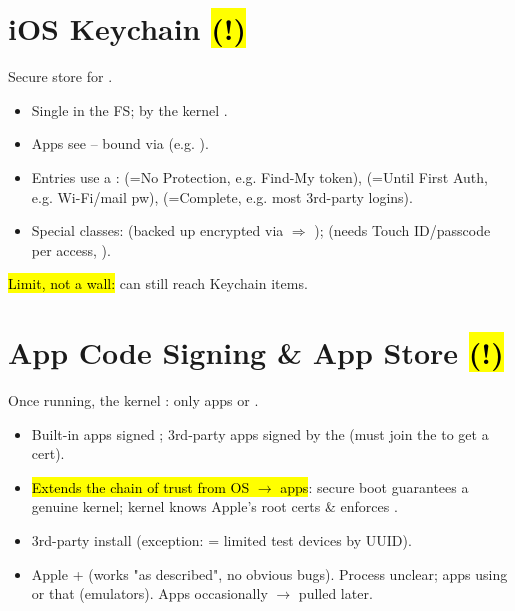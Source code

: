 \section{iOS Keychain \hl{(!)}}
Secure store for .
\begin{itemize}
\item Single  in the FS;  by the kernel .
\item Apps see  -- bound via  (e.g. ).
\item Entries use a : (=No Protection, e.g. Find-My token), (=Until First Auth, e.g. Wi-Fi/mail pw), (=Complete, e.g. most 3rd-party logins).
\item Special classes:  (backed up encrypted via  $\Rightarrow$ );  (needs Touch ID/passcode per access, ).
\end{itemize}
\hl{Limit, not a wall:}  can still reach Keychain items.

\section{App Code Signing \& App Store \hl{(!)}}
Once running, the kernel : only apps  or .
\begin{itemize}
\item Built-in apps signed ; 3rd-party apps signed by the  (must join the  to get a cert).
\item \hl{Extends the chain of trust from OS $\to$ apps}: secure boot guarantees a genuine kernel; kernel knows Apple's root certs \& enforces .
\item 3rd-party install  (exception:  = limited test devices by UUID).
\item Apple  +  (works "as described", no obvious bugs). Process unclear;  apps using  or that  (emulators). Apps  occasionally $\to$ pulled later.
\end{itemize}

